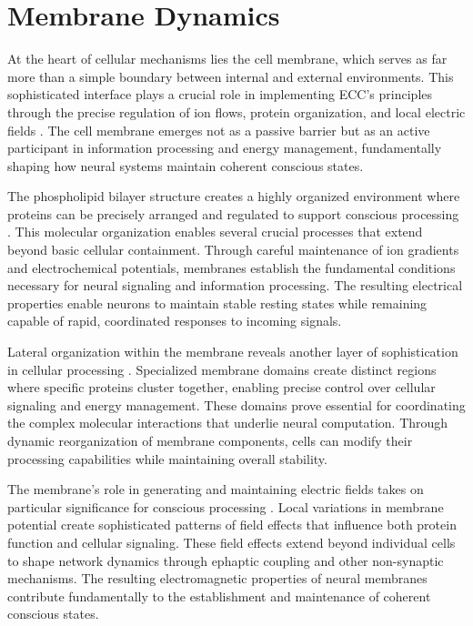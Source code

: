 \section{Membrane Dynamics}

At the heart of cellular mechanisms lies the cell membrane, which serves as far more than a simple boundary between internal and external environments. This sophisticated interface plays a crucial role in implementing ECC's principles through the precise regulation of ion flows, protein organization, and local electric fields \cite{Andersen1992}. The cell membrane emerges not as a passive barrier but as an active participant in information processing and energy management, fundamentally shaping how neural systems maintain coherent conscious states.

The phospholipid bilayer structure creates a highly organized environment where proteins can be precisely arranged and regulated to support conscious processing \cite{Goni2014}. This molecular organization enables several crucial processes that extend beyond basic cellular containment. Through careful maintenance of ion gradients and electrochemical potentials, membranes establish the fundamental conditions necessary for neural signaling and information processing. The resulting electrical properties enable neurons to maintain stable resting states while remaining capable of rapid, coordinated responses to incoming signals.

Lateral organization within the membrane reveals another layer of sophistication in cellular processing \cite{Garcia-Parajo2014}. Specialized membrane domains create distinct regions where specific proteins cluster together, enabling precise control over cellular signaling and energy management. These domains prove essential for coordinating the complex molecular interactions that underlie neural computation. Through dynamic reorganization of membrane components, cells can modify their processing capabilities while maintaining overall stability.

The membrane's role in generating and maintaining electric fields takes on particular significance for conscious processing \cite{Bezanilla2002}. Local variations in membrane potential create sophisticated patterns of field effects that influence both protein function and cellular signaling. These field effects extend beyond individual cells to shape network dynamics through ephaptic coupling and other non-synaptic mechanisms. The resulting electromagnetic properties of neural membranes contribute fundamentally to the establishment and maintenance of coherent conscious states.

